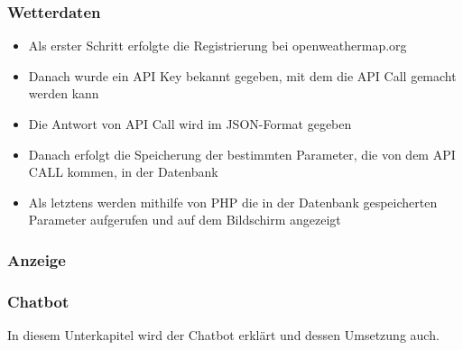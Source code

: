 \subsubsection{Wetterdaten}
\begin{itemize}
	\item Als erster Schritt erfolgte die Registrierung bei openweathermap.org 
\end{itemize}
\begin{itemize}
	\item 	Danach wurde ein API Key bekannt gegeben, mit dem die API Call gemacht werden kann
\end{itemize}
\begin{itemize}
	\item Die Antwort von API Call wird im JSON-Format gegeben
\end{itemize}
\begin{itemize}
	\item Danach erfolgt die Speicherung der bestimmten Parameter, die von dem API CALL kommen, in der Datenbank
\end{itemize}
\begin{itemize}
	\item Als letztens werden mithilfe von PHP die in der Datenbank gespeicherten Parameter aufgerufen und auf dem Bildschirm angezeigt
\end{itemize}
\subsubsection{Anzeige}	
\subsubsection{Chatbot}
In diesem Unterkapitel wird der Chatbot erklärt und dessen Umsetzung auch.
